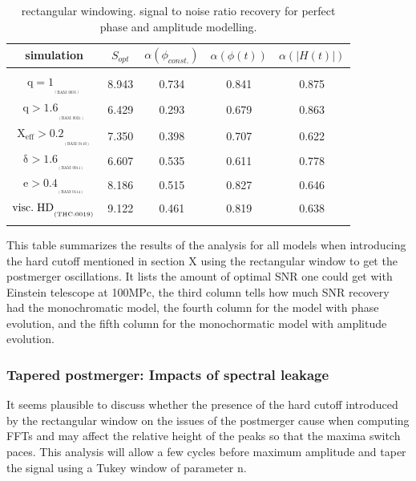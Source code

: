 \begin{table}[!htbp]
\begin{center}

\begin{tabular}{ccccc}

simulation&$S_{opt}$&$\alpha(\phi_{const.})$&$\alpha(\phi(t))$&$\alpha(|H(t)|)$\\ 
\hline\\ 
$\mathrm{{q=1}_{_{_{(BAM:0035)}}}}$&8.943&0.734&0.841&0.875\\  
$\mathrm{{q>1.6}_{_{_{(BAM:0021)}}}}$&6.429&0.293&0.679&0.863\\  
$\mathrm{{X_{eff}>0.2}_{_{_{(BAM:0110)}}}}$&7.350&0.398&0.707&0.622\\  
$\mathrm{{\delta>1.6}_{_{_{(BAM:0011)}}}}$&6.607&0.535&0.611&0.778\\  
$\mathrm{{e>0.4}_{_{_{(BAM:0114)}}}}$&8.186&0.515&0.827&0.646\\  
$\mathrm{{visc.\hspace{1mm} HD}_{_{_{(THC:0019)}}}}$&9.122&0.461&0.819&0.638\\  
\hline\\ 

\end{tabular}
\end{center}
\caption{rectangular windowing. signal to noise ratio recovery for perfect phase and amplitude modelling.}
This table summarizes the results of the analysis for all models when introducing the hard cutoff mentioned in section X using the rectangular window to get the postmerger oscillations. It lists the amount of optimal SNR one could get with Einstein telescope at 100MPc, the third column tells how much SNR recovery had the monochromatic model, the fourth column for the model with phase evolution, and the fifth column for the monochormatic model with amplitude evolution.
\label{table untapered}
\end{table}
\FloatBarrier

\subsubsection*{Tapered postmerger: Impacts of spectral leakage}

It seems plausible to discuss whether the presence of the hard cutoff introduced by the rectangular window on the issues of the postmerger cause when computing FFTs and may affect the relative height of the peaks so that the maxima switch paces. This analysis will allow a few cycles before maximum amplitude and taper the signal using a Tukey window of parameter n.

